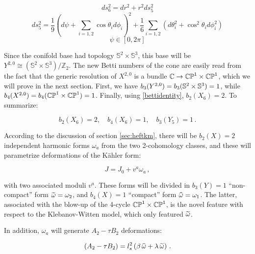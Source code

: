 \begin{equation}
	ds_6^2 = dr^2 + r^2 ds_5^2
	\label{}
\end{equation}
\begin{equation}
	ds_5^2 = \frac{1}{9}\left( d\psi + \sum_{i=1,2} \cos\theta_i d\phi_i\right)^2 + 
	\frac{1}{6} \sum_{i=1,2} \left(d\theta_i^2 + \cos^2\theta_i d\phi_i^2 \right)
\end{equation}
\begin{equation}
	\psi \in [0,2\pi]
	\label{}
\end{equation}

Since the conifold base had topology $\mathbb{S}^2 \times \mathbb{S}^3$\cite{Candelas}, this base will be $Y^{2,0} \cong (\mathbb{S}^2 \times \mathbb{S}^3)/\mathbb{Z}_2$. The new Betti numbers of the cone are easily read from the fact that the generic resolution of $X^{2,0}$ is a bundle $\mathbb{C} \rightarrow \mathbb{CP}^1 \times \mathbb{CP}^1$, which we will prove in the next section. First, we have $b_3(Y^{2,0}) = b_3(\mathbb{S}^2 \times \mathbb{S}^3) = 1$, while $b_4(X^{2,0}) = b_4(\mathbb{CP}^1 \times \mathbb{CP}^1) = 1$. Finally, using \eqref{bettidentity}, $b_2(X_6) = 2$. To summarize:

\begin{equation}
	b_2(X_6) = 2,\quad b_4(X_6) = 1,\quad b_3(Y_5) = 1\,.
	\label{}
\end{equation}


According to the discussion of section \ref{sec:heftkm}, there will be $b_2(X) = 2$ independent harmonic forms $\omega_a$ from the two 2-cohomology classes, and these will parametrize deformations of the K\"ahler form:

\begin{equation}
	J = J_0 + v^a \omega_a\,,
	\label{}
\end{equation}

with two associated moduli $v^a$. These forms will be divided in $b_3(Y) = 1$ ``non-compact'' form $\widetilde{\omega} = \omega_2$, and $b_4(X) = 1$ ``compact'' form $\widehat{\omega}= \omega_1$. The latter, associated with the blow-up of the 4-cycle $\mathbb{CP}^1\times\mathbb{CP}^1$, is the novel feature with respect to the Klebanov-Witten model, which only featured $\widetilde{\omega}$.

In addition, $\omega_a$ will generate $A_2 - \tau B_2$ deformations:

\begin{equation}
	(A_2 - \tau B_2) = l_s^2 \left( \beta \, \widehat{\omega} + \lambda \, \widetilde{\omega} \right) \,.
	\label{}
\end{equation}

